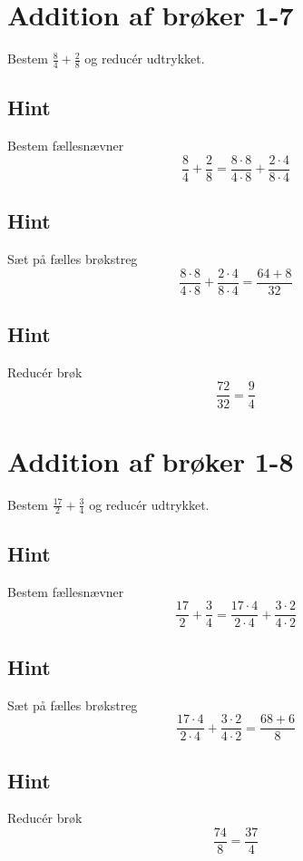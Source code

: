 \documentclass{article}
\newenvironment{exercise}[1]{\newpage\section{#1}}{}
\newcommand{\answerbox}[1]{\fbox{$#1$}}
\newcommand{\hint}{\subsection*{Hint}}
\begin{document}
	\begin{exercise}{Addition af brøker 1-7}
		
		Bestem $\frac{8}{4}+\frac{2}{8}$ og reducér udtrykket.
		
		\answerbox{\frac{9}{4}}
		
		\hint
		
		Bestem fællesnævner
		\[
		\frac{8}{4}+\frac{2}{8}  = \frac{8 \cdot 8}{4 \cdot 8}+\frac{2 \cdot 4}{8\cdot 4} 
		\]
		
		\hint
		
		Sæt på fælles brøkstreg
		\[
		 \frac{8 \cdot 8}{4 \cdot 8}+\frac{2 \cdot 4}{8\cdot 4}  = \frac{64+8}{32} 
		\]
		
		\hint
		
		Reducér brøk
		\[
		\frac{72}{32} = \frac{9}{4}
		\]
		
	\end{exercise}
	
	\newpage
	
	\begin{exercise}{Addition af brøker 1-8}
		
		Bestem $\frac{17}{2}+\frac{3}{4}$ og reducér udtrykket.
		
		\answerbox{\frac{37}{4}}
		
		\hint
		
		Bestem fællesnævner
		\[
		\frac{17}{2}+\frac{3}{4}  = \frac{17 \cdot 4}{2 \cdot 4}+\frac{3 \cdot 2}{4\cdot 2} 
		\]
		
		\hint
		
		Sæt på fælles brøkstreg
		\[
		\frac{17 \cdot 4}{2 \cdot 4}+\frac{3 \cdot 2}{4\cdot 2}   = \frac{68+6}{8} 
		\]
		
		\hint
		
		Reducér brøk
		\[
		\frac{74}{8} = \frac{37}{4}
		\]
		
	\end{exercise}
	
	
\end{document}
